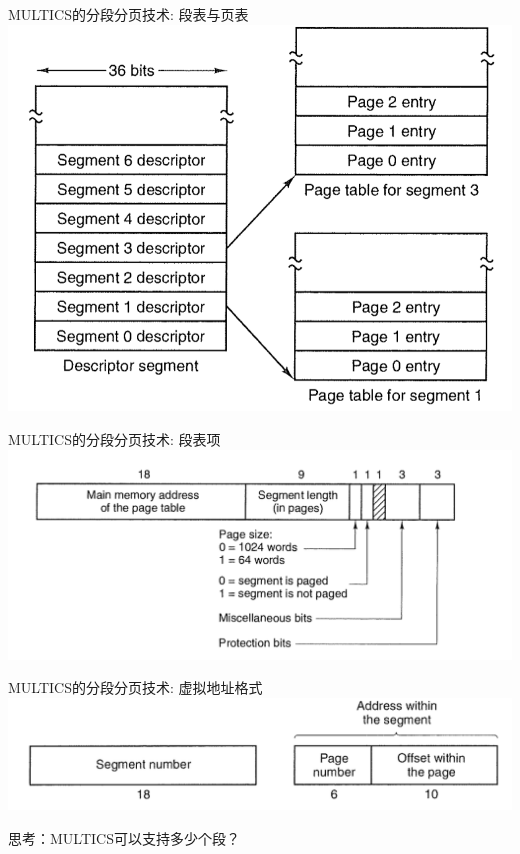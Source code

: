 \documentclass[xcolor=svgnames]{beamer}
\begin{document}
\begin{CJK*}{UTF8}{gbsn}
\begin{frame}{MULTICS的分段分页技术: 段表与页表}
\includegraphics[width=1.0\textwidth]{seg1.png}
\end{frame}

\begin{frame}{MULTICS的分段分页技术: 段表项}
\includegraphics[width=1.0\textwidth]{seg2.png}
\end{frame}

\begin{frame}{MULTICS的分段分页技术: 虚拟地址格式}
\includegraphics[width=1.0\textwidth]{seg3.png}

思考：MULTICS可以支持多少个段？%
\end{frame}


\end{CJK*}
\end{document}
